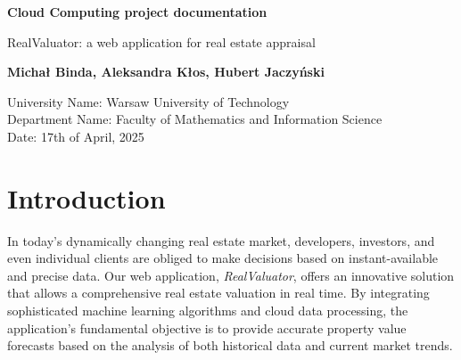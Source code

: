 \documentclass{article}
\begin{document}
\onehalfspacing
\begin{titlepage}
   \begin{center}
       \vspace*{7cm}
    \huge
       \textbf{Cloud Computing project documentation}
       \vspace{0.5 cm}
       \huge
       
        RealValuator: a web application for real estate appraisal 
       \vspace{1.5 cm}
    \large
    
       \textbf{Michał Binda, Aleksandra Kłos, Hubert Jaczyński}
       \vfill
    \large
       \vspace{0.7 cm}
    
       University Name: Warsaw University of Technology\\
       Department Name: Faculty of Mathematics and Information Science\\ 
       Date: 17th of April, 2025\\
            
   \end{center}
\end{titlepage}


\begin{titlepage}
   \begin{center}
       \vspace*{0.7 cm}
    \tableofcontents        
   \end{center}
\end{titlepage}


\section{Introduction}

In today's dynamically changing real estate market, developers, investors, and even individual clients are obliged to make decisions based on instant-available and precise data. Our web application, \textit{RealValuator}, offers an innovative solution that allows a comprehensive real estate valuation in real time. By integrating sophisticated machine learning algorithms and cloud data processing, the application's fundamental objective is to provide accurate property value forecasts based on the analysis of both historical data and current market trends.
\end{document}
